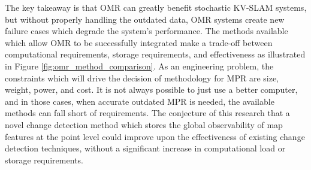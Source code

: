 The key takeaway is that OMR can greatly benefit stochastic KV-SLAM systems, but without properly handling the outdated data, OMR systems create new failure cases which degrade the system's performance. The methods available which allow OMR to be successfully integrated make a trade-off between computational requirements, storage requirements, and effectiveness as illustrated in Figure \ref{fig:omr_method_comparison}. As an engineering problem, the constraints which will drive the decision of methodology for MPR are size, weight, power, and cost. It is not always possible to just use a better computer, and in those cases, when accurate outdated MPR is needed, the available methods can fall short of requirements. The conjecture of this research that a novel change detection method which stores the global observability of map features at the point level could improve upon the effectiveness of existing change detection techniques, without a significant increase in computational load or storage requirements.